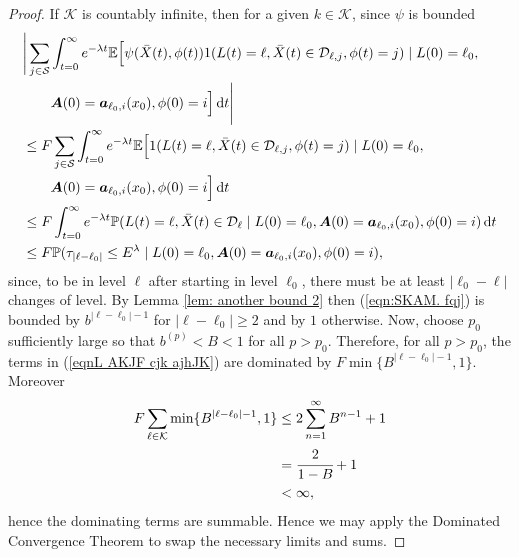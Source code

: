 \begin{proof}
	If \(\mathcal K\) is countably infinite, then for a given \(k\in\mathcal K\), since \(\psi\) is bounded
	\begin{align}
		&\Bigg|\sum_{j\in\mathcal S}\int_{t=0}^\infty e^{-\lambda t}\mathbb E\Big[\psi(\bar X(t),\phi(t)) 1(L(t)=\ell, \bar X(t) \in \mathcal D_{\ell,j},\phi(t)=j)  \mid L(0)=\ell_0, \nonumber 
		\\&\qquad{} \boldsymbol A(0)=\boldsymbol  a_{\ell_0,i}(x_0), \phi(0)=i \Big] \, \mathrm{d} t\Bigg| \nonumber 
		\\&\leq F \sum_{j\in\mathcal S}\int_{t=0}^\infty e^{-\lambda t}\mathbb E\Big[ 1(L(t)=\ell, \bar X(t) \in \mathcal D_{\ell,j},\phi(t)=j)  \mid L(0)=\ell_0, \nonumber 
		\\&\qquad{} \boldsymbol A(0)=\boldsymbol  a_{\ell_0,i}(x_0), \phi(0)=i \Big] \, \mathrm{d} t \nonumber 
		\\&\leq F  \int_{t=0}^\infty e^{-\lambda t}\mathbb P( L(t)=\ell, \bar X(t) \in \mathcal D_{\ell} \mid L(0)=\ell_0,  
		\boldsymbol A(0)=\boldsymbol  a_{\ell_0,i}(x_0), \phi(0)=i )\, \mathrm{d} t \nonumber 
		\\&\leq F \mathbb P(\tau_{|\ell-\ell_0|}\leq E^\lambda \mid L(0)=\ell_0,  
			\boldsymbol A(0)=\boldsymbol  a_{\ell_0,i}(x_0), \phi(0)=i), \label{eqn:SKAM. fqj}
	\end{align}
	since, to be in level \(\ell\) after starting in level \(\ell_0\), there must be at least \(|\ell_0-\ell|\) changes of level. By Lemma \ref{lem: another bound 2} then (\ref{eqn:SKAM. fqj}) is bounded by \(b^{|\ell-\ell_0|-1}\) for \(|\ell-\ell_0|\geq 2\) and by \(1\) otherwise. Now, choose \(p_0\) sufficiently large so that \(b^{(p)}<B<1\) for all \(p>p_0\). Therefore, for all \(p>p_0\), the terms in (\ref{eqnL AKJF cjk ajhJK}) are dominated by \(F\min\{B^{|\ell-\ell_0|-1},1\}\). Moreover 
	\begin{align*}
		F\sum_{\ell\in\mathcal K} \min\{B^{|\ell-\ell_0|-1},1\} 
		&\leq2\sum_{n=1}^\infty B^{n-1}+1
		\\&=\cfrac{2}{1-B}+1
		\\&<\infty,
	\end{align*}
	hence the dominating terms are summable. Hence we may apply the Dominated Convergence Theorem to swap the necessary limits and sums. 
\end{proof}

